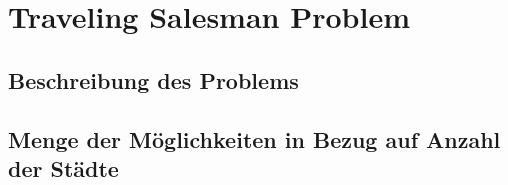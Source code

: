 \section{Traveling Salesman Problem}

\subsection{Beschreibung des Problems}

\subsection{Menge der Möglichkeiten in Bezug auf Anzahl der Städte}